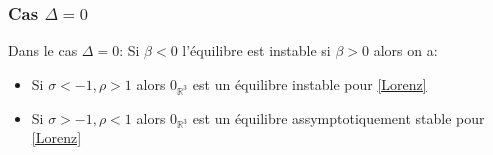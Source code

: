 \documentclass{article}
\newcommand{\R}{\mathbb{R}}
\newtheorem[M , nocut]{prop}{Proposition}[section]
\newtheorem[M , nocut]{definition}{Définition}
\newtheorem[M , nocut]{lemme}{Lemme}
\newtheorem[L , nocut]{thm}{Théoreme}
\newtheorem[M , nocut]{cor}{Corollaire}
\begin{document}
\subsubsection*{Cas $\Delta = 0$}


\begin{prop}\label{prop:eqDeg0}
    Dans le cas $\Delta=0$:
    Si $\beta <0$ l'équilibre est instable si $\beta>0$ alors on a:
    \begin{itemize}
        \item Si $\sigma < -1 , \rho > 1$ alors $0_{\R^3}$ est un équilibre instable pour \eqref{Lorenz}
        \item Si $\sigma > -1 , \rho < 1$ alors $0_{\R^3}$ est un équilibre assymptotiquement stable pour \eqref{Lorenz}
    \end{itemize}
\end{prop}
\end{document}
